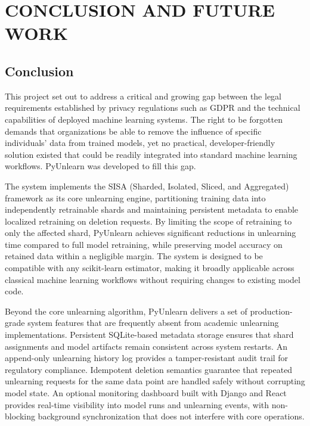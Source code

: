 \chapter{CONCLUSION AND FUTURE WORK}

\section{Conclusion}

This project set out to address a critical and growing gap between the legal requirements established by privacy regulations such as GDPR \cite{gdpr2016} and the technical capabilities of deployed machine learning systems. The right to be forgotten demands that organizations be able to remove the influence of specific individuals' data from trained models, yet no practical, developer-friendly solution existed that could be readily integrated into standard machine learning workflows. PyUnlearn was developed to fill this gap.

The system implements the SISA (Sharded, Isolated, Sliced, and Aggregated) framework \cite{bourtoule2021machine} as its core unlearning engine, partitioning training data into independently retrainable shards and maintaining persistent metadata to enable localized retraining on deletion requests. By limiting the scope of retraining to only the affected shard, PyUnlearn achieves significant reductions in unlearning time compared to full model retraining, while preserving model accuracy on retained data within a negligible margin. The system is designed to be compatible with any scikit-learn estimator, making it broadly applicable across classical machine learning workflows without requiring changes to existing model code.

Beyond the core unlearning algorithm, PyUnlearn delivers a set of production-grade system features that are frequently absent from academic unlearning implementations. Persistent SQLite-based metadata storage ensures that shard assignments and model artifacts remain consistent across system restarts. An append-only unlearning history log provides a tamper-resistant audit trail for regulatory compliance. Idempotent deletion semantics guarantee that repeated unlearning requests for the same data point are handled safely without corrupting model state. An optional monitoring dashboard built with Django and React provides real-time visibility into model runs and unlearning events, with non-blocking background synchronization that does not interfere with core operations.


